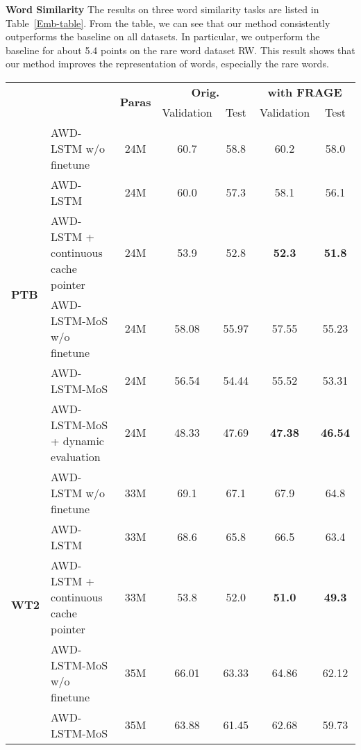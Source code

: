 \documentclass{article}
\begin{document}
\textbf{Word Similarity} The results on three word similarity tasks are listed in Table~\ref{Emb-table}. From the table, we can see that our method consistently outperforms the baseline on all datasets. In particular, we outperform the baseline for about 5.4 points on the rare word dataset RW. This result shows that our method improves the representation of words, especially the rare words.
\begin{table}[htbp]
\begin{center}
		\begin{tabular}{l|l||c||cc||cc}
			\toprule
			&&\multirow{2}{*}{\bf Paras} & \multicolumn{2}{c||}{\bf Orig.} & \multicolumn{2}{c}{\bf with FRAGE}\\
            \cline{4-7}
            &&& Validation & Test & Validation & Test\\
            \bottomrule
            \toprule
            \multirow{6}{*}{\bf PTB}& AWD-LSTM w/o finetune\cite{DBLP:journals/corr/abs-1708-02182} &24M& 60.7 & 58.8 & 60.2 & 58.0\\
            &AWD-LSTM\cite{DBLP:journals/corr/abs-1708-02182}  &24M& 60.0 & 57.3 & 58.1 & 56.1\\
            &AWD-LSTM + continuous cache pointer\cite{DBLP:journals/corr/abs-1708-02182} &24M& 53.9 & 52.8 & \bf 52.3 & \bf 51.8\\
            \cline{2-7}
            &AWD-LSTM-MoS w/o finetune\cite{DBLP:journals/corr/abs-1711-03953} &24M& 58.08 & 55.97 & 57.55 & 55.23\\
            &AWD-LSTM-MoS\cite{DBLP:journals/corr/abs-1711-03953}  &24M& 56.54 & 54.44 & 55.52 & 53.31 \\
            &AWD-LSTM-MoS + dynamic evaluation\cite{DBLP:journals/corr/abs-1711-03953} &24M&48.33 & 47.69 & \bf 47.38 & \bf 46.54\\
            \bottomrule
            \toprule
            \multirow{6}{*}{\bf WT2} &AWD-LSTM w/o finetune\cite{DBLP:journals/corr/abs-1708-02182} &33M& 69.1 & 67.1 & 67.9 & 64.8\\
            &AWD-LSTM\cite{DBLP:journals/corr/abs-1708-02182}  &33M& 68.6 & 65.8 & 66.5 & 63.4\\
            &AWD-LSTM + continuous cache pointer\cite{DBLP:journals/corr/abs-1708-02182} &33M& 53.8 & 52.0 & \bf 51.0 & \bf 49.3\\
            \cline{2-7}
            &AWD-LSTM-MoS w/o finetune\cite{DBLP:journals/corr/abs-1711-03953} &35M& 66.01 & 63.33 &  64.86 &  62.12\\
            &AWD-LSTM-MoS\cite{DBLP:journals/corr/abs-1711-03953} &35M& 63.88 & 61.45 &  62.68 &  59.73\\

\end{tabular}
\end{center}
\end{table}
\end{document}
